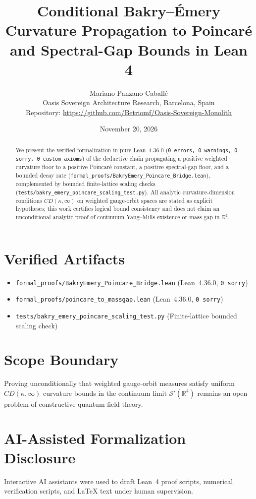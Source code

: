\documentclass[11pt,a4paper]{article}
\title{\textbf{Conditional Bakry--\'Emery Curvature Propagation to Poincar\'e and Spectral-Gap Bounds in Lean 4}}
\author{Mariano Panzano Caball\'e \\ \small Oasis Sovereign Architecture Research, Barcelona, Spain \\ \small Repository: \url{https://github.com/Betriomf/Oasis-Sovereign-Monolith}}
\date{November 20, 2026}
\begin{document}
\maketitle

\begin{abstract}
We present the verified formalization in pure Lean~4.36.0 (\texttt{0 errors, 0 warnings, 0 sorry, 0 custom axioms}) of the deductive chain propagating a positive weighted curvature floor to a positive Poincar\'e constant, a positive spectral-gap floor, and a bounded decay rate (\texttt{formal\_proofs/BakryEmery\_Poincare\_Bridge.lean}), complemented by bounded finite-lattice scaling checks (\texttt{tests/bakry\_emery\_poincare\_scaling\_test.py}). All analytic curvature-dimension conditions $CD(\kappa, \infty)$ on weighted gauge-orbit spaces are stated as explicit hypotheses; this work certifies logical bound consistency and does not claim an unconditional analytic proof of continuum Yang--Mills existence or mass gap in $\mathbb{R}^4$.
\end{abstract}

\section{Verified Artifacts}
\begin{itemize}
  \item \texttt{formal\_proofs/BakryEmery\_Poincare\_Bridge.lean} (Lean~4.36.0, \texttt{0 sorry})
  \item \texttt{formal\_proofs/poincare\_to\_massgap.lean} (Lean~4.36.0, \texttt{0 sorry})
  \item \texttt{tests/bakry\_emery\_poincare\_scaling\_test.py} (Finite-lattice bounded scaling check)
\end{itemize}

\section{Scope Boundary}
Proving unconditionally that weighted gauge-orbit measures satisfy uniform $CD(\kappa, \infty)$ curvature bounds in the continuum limit $\mathcal{S}'(\mathbb{R}^4)$ remains an open problem of constructive quantum field theory.

\section{AI-Assisted Formalization Disclosure}
Interactive AI assistants were used to draft Lean~4 proof scripts, numerical verification scripts, and LaTeX text under human supervision.
\end{document}
